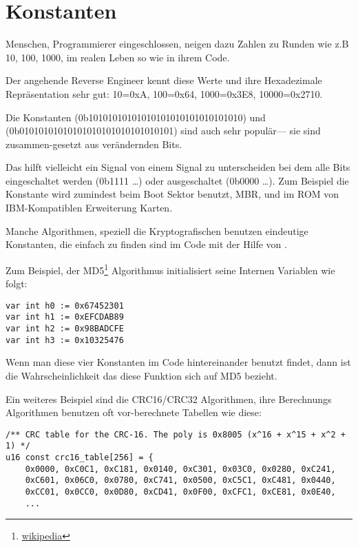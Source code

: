 \section{Konstanten}

Menschen, Programmierer eingeschlossen, neigen dazu Zahlen zu Runden wie z.B 10, 100, 1000,
im realen Leben so wie in ihrem Code.

Der angehende Reverse Engineer kennt diese Werte und ihre Hexadezimale Repr\"asentation sehr gut:
10=0xA, 100=0x64, 1000=0x3E8, 10000=0x2710.

Die Konstanten  (0b10101010101010101010101010101010) und 
 (0b01010101010101010101010101010101) sind auch sehr popul\"ar---
sie sind zusammen-gesetzt aus ver\"andernden Bits. %

Das hilft vielleicht ein Signal von einem Signal zu unterscheiden bei dem alle Bits eingeschaltet werden  (0b1111 \dots) oder ausgeschaltet (0b0000 \dots).
Zum Beispiel die  Konstante wird
zumindest beim Boot Sektor benutzt, \ac{MBR},
und im \ac{ROM} von IBM-Kompatiblen Erweiterung Karten.

Manche Algorithmen, speziell die Kryptografischen benutzen eindeutige Konstanten, die einfach zu finden 
sind im Code mit der Hilfe von \IDA.

\newcommand{\URLMD}{http://go.yurichev.com/17111}

Zum Beispiel, der MD5\footnote{\href{\URLMD}{wikipedia}} Algorithmus initialisiert seine Internen Variablen wie folgt:


\begin{verbatim}
var int h0 := 0x67452301
var int h1 := 0xEFCDAB89
var int h2 := 0x98BADCFE
var int h3 := 0x10325476
\end{verbatim}

Wenn man diese vier Konstanten im Code hintereinander benutzt findet, dann ist die Wahrscheinlichkeit das diese Funktion 
sich auf MD5 bezieht.

\par Ein weiteres Beispiel sind die CRC16/CRC32 Algorithmen,
ihre Berechnungs Algorithmen benutzen oft vor-berechnete Tabellen wie diese:

\begin{lstlisting}[caption=linux/lib/crc16.c,style=customc]
/** CRC table for the CRC-16. The poly is 0x8005 (x^16 + x^15 + x^2 + 1) */
u16 const crc16_table[256] = {
	0x0000, 0xC0C1, 0xC181, 0x0140, 0xC301, 0x03C0, 0x0280, 0xC241,
	0xC601, 0x06C0, 0x0780, 0xC741, 0x0500, 0xC5C1, 0xC481, 0x0440,
	0xCC01, 0x0CC0, 0x0D80, 0xCD41, 0x0F00, 0xCFC1, 0xCE81, 0x0E40,
	...
\end{lstlisting}

